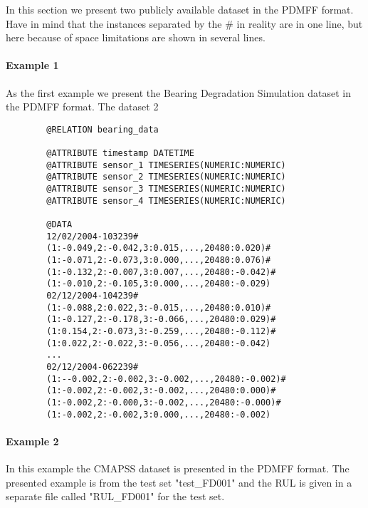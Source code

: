 In this section we present two publicly available dataset in
the PDMFF format. Have in mind that the instances separated
by the \# in reality are in one line, but here because of space
limitations are shown in several lines.

\paragraph{Example 1} As the first example we present the Bearing Degradation Simulation
dataset \cite{bearingData} in the PDMFF format. The dataset 2

\begin{verbatim}
        @RELATION bearing_data

        @ATTRIBUTE timestamp DATETIME
        @ATTRIBUTE sensor_1 TIMESERIES(NUMERIC:NUMERIC)
        @ATTRIBUTE sensor_2 TIMESERIES(NUMERIC:NUMERIC)
        @ATTRIBUTE sensor_3 TIMESERIES(NUMERIC:NUMERIC)
        @ATTRIBUTE sensor_4 TIMESERIES(NUMERIC:NUMERIC)

        @DATA
        12/02/2004-103239#
        (1:-0.049,2:-0.042,3:0.015,...,20480:0.020)#
        (1:-0.071,2:-0.073,3:0.000,...,20480:0.076)#
        (1:-0.132,2:-0.007,3:0.007,...,20480:-0.042)#
        (1:-0.010,2:-0.105,3:0.000,...,20480:-0.029)
        02/12/2004-104239#
        (1:-0.088,2:0.022,3:-0.015,...,20480:0.010)#
        (1:-0.127,2:-0.178,3:-0.066,...,20480:0.029)#
        (1:0.154,2:-0.073,3:-0.259,...,20480:-0.112)#
        (1:0.022,2:-0.022,3:-0.056,...,20480:-0.042)
        ...
        02/12/2004-062239#
        (1:--0.002,2:-0.002,3:-0.002,...,20480:-0.002)#
        (1:-0.002,2:-0.002,3:-0.002,...,20480:0.000)#
        (1:-0.002,2:-0.000,3:-0.002,...,20480:-0.000)#
        (1:-0.002,2:-0.002,3:0.000,...,20480:-0.002)
    \end{verbatim}

\paragraph{Example 2}
In this example the CMAPSS dataset \cite{cmapssData} is presented in
the PDMFF format. The presented example is from the test set "test\_FD001" and the RUL
is given in a separate file called "RUL\_FD001" for the test set.

